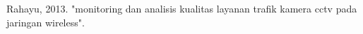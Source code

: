 \documentclass{jtetiproposalskripsi}
\begin{document}
\begin{thebibliography}{9}

Rahayu, 2013. "monitoring dan analisis kualitas layanan trafik kamera cctv pada jaringan wireless".


\end{thebibliography}
\end{document}
